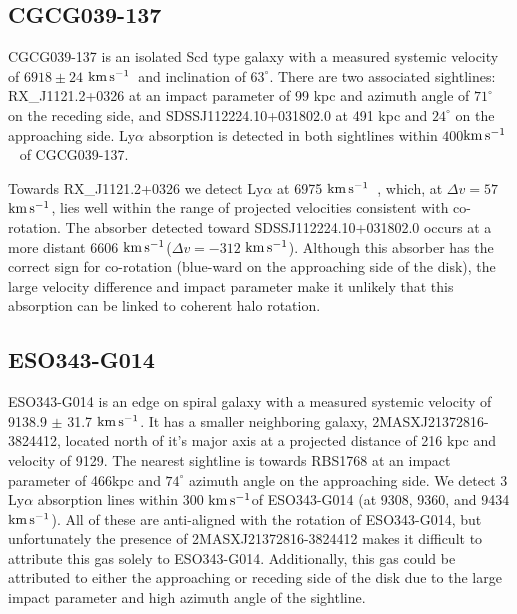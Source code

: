 \documentclass[iop]{emulateapj-rtx4}
\newcommand{\kms}{$\rm km\, s^{-1}$}
\begin{document}
\subsection{CGCG039-137}

CGCG039-137 is an isolated Scd type galaxy with a measured systemic velocity of $6918 \pm 24$ \kms~and inclination of $63^{\circ}$. There are two associated sightlines: RX\_J1121.2+0326 at an impact parameter of 99 kpc and azimuth angle of $71^{\circ}$ on the receding side, and SDSSJ112224.10+031802.0 at 491 kpc and $24^{\circ}$ on the approaching side. Ly$\alpha$ absorption is detected in both sightlines within $400$\kms~ of CGCG039-137. 

Towards RX\_J1121.2+0326 we detect Ly$\alpha$ at 6975 \kms~, which, at $\Delta v = 57$ \kms, lies well within the range of projected velocities consistent with co-rotation. The absorber detected toward SDSSJ112224.10+031802.0 occurs at a more distant 6606 \kms ($\Delta v = -312$ \kms). Although this absorber has the correct sign for co-rotation (blue-ward on the approaching side of the disk), the large velocity difference and impact parameter make it unlikely that this absorption can be linked to coherent halo rotation.


%
%


\subsection{ESO343-G014}
ESO343-G014 is an edge on spiral galaxy with a measured systemic velocity of 9138.9 $\pm$ 31.7 \kms. It has a smaller neighboring galaxy, 2MASXJ21372816-3824412, located north of it's major axis at a projected distance of 216 kpc and velocity of 9129. The nearest sightline is towards RBS1768 at an impact parameter of 466kpc and $74^{\circ}$ azimuth angle on the approaching side. We detect 3 Ly$\alpha$ absorption lines within 300 \kms of ESO343-G014 (at 9308, 9360, and 9434 \kms). All of these are anti-aligned with the rotation of ESO343-G014, but unfortunately the presence of 2MASXJ21372816-3824412 makes it difficult to attribute this gas solely to ESO343-G014. Additionally, this gas could be attributed to either the approaching or receding side of the disk due to the large impact parameter and high azimuth angle of the sightline.
\end{document}
